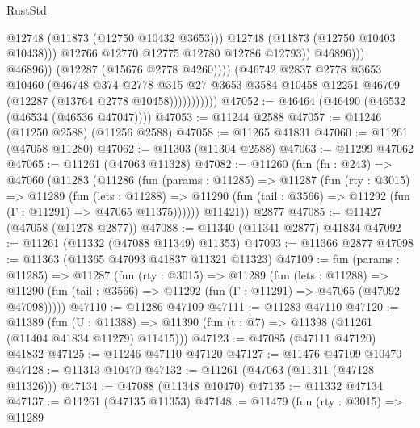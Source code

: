 \begin{lexlean}{RustStd}
\begin{coremodule}
                                        @12748
                                        (@11873 (@12750 @10432 @3653)))
                                      @12748
                                      (@11873 (@12750 @10403 @10438)))
                                    @12766
                                    @12770
                                    @12775
                                    @12780
                                    @12786
                                    @12793))
                                @46896)))
                          @46896))
                      (@12287 (@15676 @2778 @4260))))
                  (@46742
                    @2837
                    @2778
                    @3653
                    @10460
                    (@46748
                      @374
                      @2778
                      @315
                      @27
                      @3653
                      @3584
                      @10458
                      @12251
                      @46709
                      (@12287 (@13764 @2778 @10458)))))))))))
@47052 := @46464 (@46490 (@46532 (@46534 (@46536 @47047))))
@47053 := @11244 @2588
@47057 := @11246 (@11250 @2588) (@11256 @2588)
@47058 := @11265 @41831
@47060 := @11261 (@47058 @11280)
@47062 := @11303 (@11304 @2588)
@47063 := @11299 @47062
@47065 := @11261 (@47063 @11328)
@47082 := @11260
    (fun (fn : @243) =>
    @47060
      (@11283
        (@11286
          (fun (params : @11285) =>
          @11287
            (fun (rty : @3015) =>
            @11289
              (fun (lets : @11288) =>
              @11290 (fun (tail : @3566) => @11292 (fun (Γ : @11291) => @47065 @11375))))))
        @11421))
    @2877
@47085 := @11427 (@47058 (@11278 @2877))
@47088 := @11340 (@11341 @2877) @41834
@47092 := @11261 (@11332 (@47088 @11349) @11353)
@47093 := @11366 @2877
@47098 := @11363 (@11365 @47093 @41837 @11321 @11323)
@47109 := fun (params : @11285) =>
  @11287
    (fun (rty : @3015) =>
    @11289
      (fun (lets : @11288) =>
      @11290 (fun (tail : @3566) => @11292 (fun (Γ : @11291) => @47065 (@47092 @47098)))))
@47110 := @11286 @47109
@47111 := @11283 @47110
@47120 := @11389
    (fun (U : @11388) => @11390 (fun (t : @7) => @11398 (@11261 (@11404 @41834 @11279) @11415)))
@47123 := @47085 (@47111 @47120) @41832
@47125 := @11246 @47110 @47120
@47127 := @11476 @47109 @10470
@47128 := @11313 @10470
@47132 := @11261 (@47063 (@11311 (@47128 @11326)))
@47134 := @47088 (@11348 @10470)
@47135 := @11332 @47134
@47137 := @11261 (@47135 @11353)
@47148 := @11479
    (fun (rty : @3015) =>
    @11289

\end{coremodule}
\end{lexlean}
